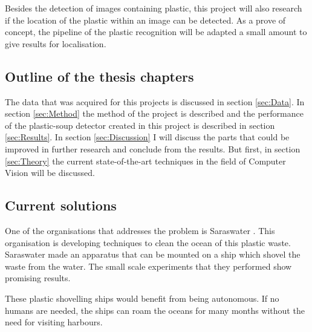 Besides the detection of images containing plastic, this project will also research if the location of the plastic within an image can be detected.
As a prove of concept, the pipeline of the plastic recognition will be adapted a small amount to give results for localisation.

\subsection{Outline of the thesis chapters}
\label{sec:Intro-Outline}
The data that was acquired for this projects is discussed in section \ref{sec:Data}. In section \ref{sec:Method} the method of the project is described and the performance of the plastic-soup detector created in this project is described in section \ref{sec:Results}.
In section \ref{sec:Discussion} I will discuss the parts that could be improved in further research and conclude from the results.
But first, in section \ref{sec:Theory} the current state-of-the-art techniques in the field of Computer Vision will be discussed.















\iffalse



\subsection{Current solutions}
\label{sec:Intro-Current}


One of the organisations that addresses the problem is Saraswater \citeneed.
This organisation is developing techniques to clean the ocean of this plastic waste.
Saraswater made an apparatus that can be mounted on a ship which shovel the waste from the water.
The small scale experiments that they performed show promising results.

These plastic shovelling ships would benefit from being autonomous.
If no humans are needed, the ships can roam the oceans for many months without the need for visiting harbours.

